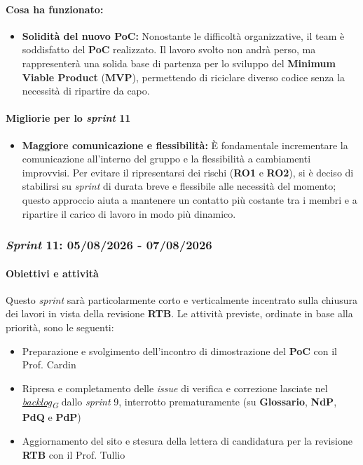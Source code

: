 \documentclass[12pt, a4paper]{article}
\newcommand{\urlglossario}{https://skynetunigroup.github.io/Code_Guardian/Documentazione/PB/glossario_v2.0.0.pdf} %
\newcommand{\glo}[2]{\href{\urlglossario\#nameddest=#2}{#1\textsubscript{G}}}
\begin{document}
{\paragraph{Cosa ha funzionato:}
\begin{itemize}
    \item \textbf{Solidità del nuovo PoC:} Nonostante le difficoltà organizzative, il team è  soddisfatto del \textbf{PoC} realizzato. Il lavoro svolto non andrà perso, ma rappresenterà una solida base di partenza per lo sviluppo del \textbf{Minimum Viable Product} (\textbf{MVP}), permettendo di riciclare diverso codice senza la necessità di ripartire da capo.
\end{itemize}

\paragraph{Migliorie per lo \textit{sprint} 11}
\begin{itemize}
    \item \textbf{Maggiore comunicazione e flessibilità:} È fondamentale incrementare la comunicazione all'interno del gruppo e la flessibilità a cambiamenti improvvisi. Per evitare il ripresentarsi dei rischi (\textbf{RO1} e \textbf{RO2}), si è deciso di stabilirsi su \textit{sprint} di durata breve e flessibile alle necessità del momento; questo approccio aiuta a mantenere un contatto più costante tra i membri e a ripartire il carico di lavoro in modo più dinamico.
\end{itemize}


\subsubsection{\textit{Sprint} 11: 05/08/2026 - 07/08/2026}

\paragraph{Obiettivi e attività}

Questo \textit{sprint} sarà particolarmente corto e verticalmente incentrato sulla chiusura dei lavori in vista della revisione \textbf{RTB}. Le attività previste, ordinate in base alla priorità, sono le seguenti:

\begin{itemize}
    \item Preparazione e svolgimento dell'incontro di dimostrazione del \textbf{PoC} con il Prof. Cardin
    \item Ripresa e completamento delle \textit{issue} di verifica e correzione lasciate nel \textit{\glo{backlog}{backlog}} dallo \textit{sprint} 9, interrotto prematuramente (su \textbf{Glossario}, \textbf{NdP}, \textbf{PdQ} e \textbf{PdP})
    \item Aggiornamento del sito e stesura della lettera di candidatura per la revisione \textbf{RTB} con il Prof. Tullio
\end{itemize}

}
\end{document}
